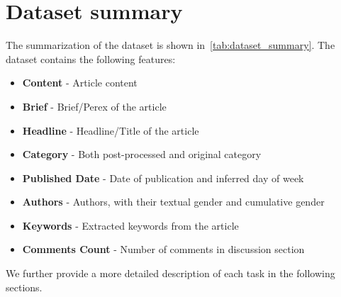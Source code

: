 \section{Dataset summary}
\begin{table}[H]
\end{table}
The summarization of the dataset is shown in~\autoref{tab:dataset_summary}.
The dataset contains the following features:
\begin{itemize}
    \item \textbf{Content} - Article content
    \item \textbf{Brief} - Brief/Perex of the article
    \item \textbf{Headline} - Headline/Title of the article
    \item \textbf{Category} - Both post-processed and original category
    \item \textbf{Published Date} - Date of publication and inferred day of week
    \item \textbf{Authors} - Authors, with their textual gender and cumulative gender
    \item \textbf{Keywords} - Extracted keywords from the article
    \item \textbf{Comments Count} - Number of comments in discussion section
\end{itemize}
We further provide a more detailed description of each task in the following sections.

